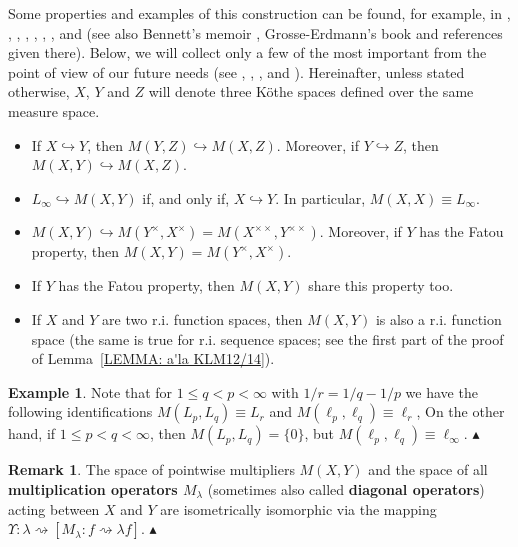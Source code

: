 \documentclass[11pt]{amsart}
\theoremstyle{definition}
\theoremstyle{definition}
\theoremstyle{definition}
\theoremstyle{definition}
\theoremstyle{definition}
\theoremstyle{definition}
\newtheorem{remark}[theorem]{Remark}
\theoremstyle{definition}
\newtheorem{example}[theorem]{Example}
\theoremstyle{definition}
\numberwithin{equation}{section}
\numberwithin{equation}{section}
\numberwithin{equation}{section}
\theoremstyle{definition}
\theoremstyle{definition}
\theoremstyle{definition}
\theoremstyle{definition}
\theoremstyle{definition}
\theoremstyle{definition}
\newcommand\xqed[1]{%
	\leavevmode\unskip\penalty9999 \hbox{}\nobreak\hfill
	\quad\hbox{#1}}
\newcommand\demo{\xqed{{\Large $\blacktriangle$}}}
\begin{document}
Some properties and examples of this construction can be found, for example, in \cite{CS14}, \cite{CDSP08}, \cite{KLM12}, \cite{KLM14}, \cite{KLM19},
\cite{LT21}, \cite{LTM22}, \cite{MP89} and \cite{Sch10} (see also Bennett's memoir \cite[\S14]{Ben96}, Grosse-Erdmann's book \cite{GE98} and references given there).
Below, we will collect only a few of the most important from the point of view of our future needs (see \cite{AS76}, \cite{CDSP08}, \cite{KLM12}, \cite{MP89} and \cite{Sch10}).
Hereinafter, unless stated otherwise, $X$, $Y$ and $Z$ will denote three K{\" o}the spaces defined over the same measure space.
\begin{itemize}
	\item[$\bullet$] If $X \hookrightarrow Y$, then $M(Y,Z) \hookrightarrow M(X,Z)$. Moreover, if $Y \hookrightarrow Z$, then $M(X,Y) \hookrightarrow M(X,Z)$.
	\item[$\bullet$] $L_{\infty} \hookrightarrow M(X,Y)$ if, and only if, $X \hookrightarrow Y$. In particular, $M(X,X) \equiv L_{\infty}$.
	\item[$\bullet$] $M(X,Y) \hookrightarrow M(Y^{\times},X^{\times}) = M(X^{\times \times}, Y^{\times \times})$. Moreover, if $Y$ has the Fatou property,
		then $M(X,Y) = M(Y^{\times},X^{\times})$.
	\item[$\bullet$] If $Y$ has the Fatou property, then $M(X,Y)$ share this property too.
	\item[$\bullet$] If $X$ and $Y$ are two r.i. function spaces, then $M(X,Y)$ is also a r.i. function space (the same is true for r.i. sequence spaces;
		see the first part of the proof of Lemma~\ref{LEMMA: a'la KLM12/14}).
\end{itemize}

\begin{example}
	Note that for $1 \leqslant q < p < \infty$ with $1/r = 1/q - 1/p$ we have the following identifications $M(L_p,L_q) \equiv L_r$ and $M(\ell_p,\ell_q) \equiv \ell_r$,
	On the other hand, if $1 \leqslant p < q < \infty$, then $M(L_p,L_q) = \{0\}$, but $M(\ell_p,\ell_q) \equiv \ell_{\infty}$.
	\demo
\end{example}

\begin{remark}
	The space of pointwise multipliers $M(X,Y)$ and the space of all {\bf multiplication operators $M_{\lambda}$}
	(sometimes also called {\bf diagonal operators}) acting between $X$ and $Y$ are isometrically isomorphic via
	the mapping $\Upsilon \colon \lambda \rightsquigarrow \left[ M_{\lambda} \colon f \rightsquigarrow \lambda f \right]$.
	\demo
\end{remark}
\end{document}
